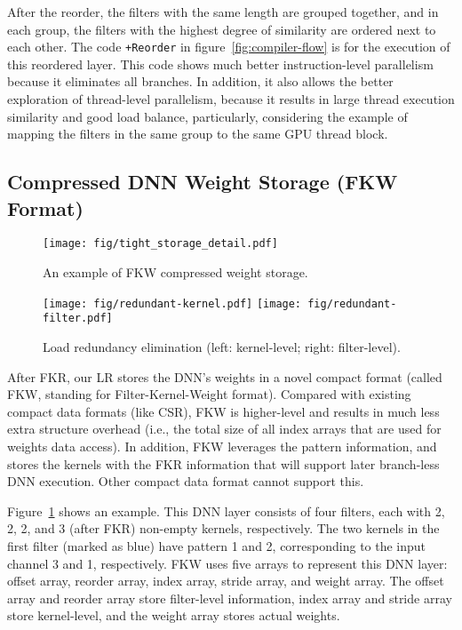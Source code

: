 \documentclass[sigplan,screen]{acmart}
\begin{document}
After the reorder, the filters with the same length are grouped together, and in each group, the filters with the highest degree of similarity are ordered next to each other. 
The code {\tt +Reorder} in figure~\ref{fig:compiler-flow} 
is for the execution of this reordered layer.
This code shows much better instruction-level parallelism because it eliminates all branches. In addition, it also allows the better exploration of thread-level parallelism, because it results in large thread execution similarity and good load balance, particularly, considering the example of mapping the filters in the same group to the same GPU thread block.




\subsection{Compressed DNN Weight Storage (FKW Format)}\label{sec:format}
\begin{figure}\centering
    \texttt{[image: fig/tight\_storage\_detail.pdf]}
\caption{An example of FKW compressed weight storage.}
    \label{fig:fkw-example}
\end{figure}



\begin{figure*}[th]
\texttt{[image: fig/redundant-kernel.pdf]}
\hfill
\texttt{[image: fig/redundant-filter.pdf]}
\caption{Load redundancy elimination (left: kernel-level; right: filter-level).}
\label{figure:load-redundancy-elimination}
    \vspace{-0.5em}
\end{figure*}

After FKR, our LR stores the DNN's weights in a novel compact format (called FKW, standing for Filter-Kernel-Weight format). Compared with existing compact data formats (like CSR), FKW is higher-level and results in much less extra structure overhead (i.e., the total size of all index arrays that are used for weights data access). 
In addition, FKW leverages the pattern information, and stores the kernels with the FKR information that will support later branch-less DNN execution. Other compact data format cannot support this.  

Figure~\ref{fig:fkw-example} shows an example. This DNN layer consists of four filters, each with 2, 2, 2, and 3 (after FKR) 
non-empty kernels, respectively. The two kernels in the first filter (marked as blue) have pattern 1 and 2, corresponding to the input channel 3 and 1, respectively. FKW uses five arrays to represent this DNN layer: offset array, reorder array, index array, stride array, and weight array. The offset array and reorder array store filter-level information, index array and stride array store kernel-level, and the weight array stores actual weights.
\end{document}
